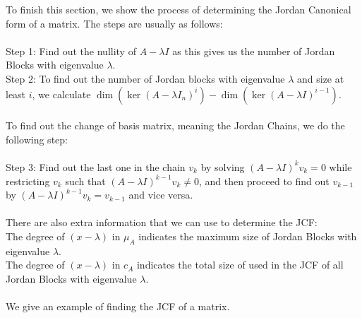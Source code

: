 To finish this section, we show the process of determining the Jordan Canonical form of a matrix. The steps are usually as follows: \\~\\
Step 1: Find out the nullity of $A-\lambda I$ as this gives us the number of Jordan Blocks with eigenvalue $\lambda$. \\
Step 2: To find out the number of Jordan blocks with eigenvalue $\lambda$ and size at least $i$, we calculate $\dim(\ker(A-\lambda I_n)^i)-\dim(\ker(A-\lambda I)^{i-1})$. \\~\\
To find out the change of basis matrix, meaning the Jordan Chains, we do the following step: \\~\\
Step 3: Find out the last one in the chain $v_k$ by solving $(A-\lambda I)^kv_k=0$ while restricting $v_k$ such that $(A-\lambda I)^{k-1}v_k\neq 0$, and then proceed to find out $v_{k-1}$ by $(A-\lambda I)^{k-1}v_k=v_{k-1}$ and vice versa. \\~\\

There are also extra information that we can use to determine the JCF: \\
The degree of $(x-\lambda)$ in $\mu_A$ indicates the maximum size of Jordan Blocks with eigenvalue $\lambda$. \\
The degree of $(x-\lambda)$ in $c_A$ indicates the total size of used in the JCF of all Jordan Blocks with eigenvalue $\lambda$. \\~\\

We give an example of finding the JCF of a matrix. 

